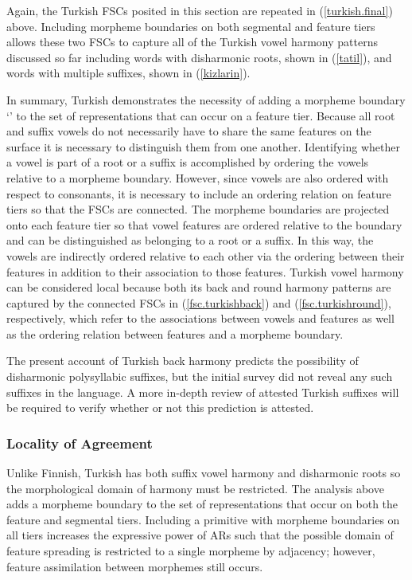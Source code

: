 \documentclass[,doc,floatsintext]{apa6}
\theoremstyle{definition}
\theoremstyle{definition}
\theoremstyle{definition}
\theoremstyle{remark}
\begin{document}
\noindent Again, the Turkish FSCs posited in this section are repeated
in (\ref{turkish.final}) above. Including morpheme boundaries on both
segmental and feature tiers allows these two FSCs to capture all of the
Turkish vowel harmony patterns discussed so far including words with
disharmonic roots, shown in (\ref{tatil}), and words with multiple
suffixes, shown in (\ref{kizlarin}).

In summary, Turkish demonstrates the necessity of adding a morpheme
boundary `\textipa{\LARGE+}' to the set of representations that can
occur on a feature tier. Because all root and suffix vowels do not
necessarily have to share the same features on the surface it is
necessary to distinguish them from one another. Identifying whether a
vowel is part of a root or a suffix is accomplished by ordering the
vowels relative to a morpheme boundary. However, since vowels are also
ordered with respect to consonants, it is necessary to include an
ordering relation on feature tiers so that the FSCs are connected. The
morpheme boundaries are projected onto each feature tier so that vowel
features are ordered relative to the boundary and can be distinguished
as belonging to a root or a suffix. In this way, the vowels are
indirectly ordered relative to each other via the ordering between their
features in addition to their association to those features. Turkish
vowel harmony can be considered local because both its back and round
harmony patterns are captured by the connected FSCs in
(\ref{fsc.turkishback}) and (\ref{fsc.turkishround}), respectively,
which refer to the associations between vowels and features as well as
the ordering relation between features and a morpheme boundary.

The present account of Turkish back harmony predicts the possibility of
disharmonic polysyllabic suffixes, but the initial survey did not reveal
any such suffixes in the language. A more in-depth review of attested
Turkish suffixes will be required to verify whether or not this
prediction is attested.

\subsubsection{Locality of Agreement}\label{locality-of-agreement}

Unlike Finnish, Turkish has both suffix vowel harmony and disharmonic
roots so the morphological domain of harmony must be restricted. The
analysis above adds a morpheme boundary to the set of representations
that occur on both the feature and segmental tiers. Including a
primitive with morpheme boundaries on all tiers increases the expressive
power of ARs such that the possible domain of feature spreading is
restricted to a single morpheme by adjacency; however, feature
assimilation between morphemes still occurs.
\end{document}
